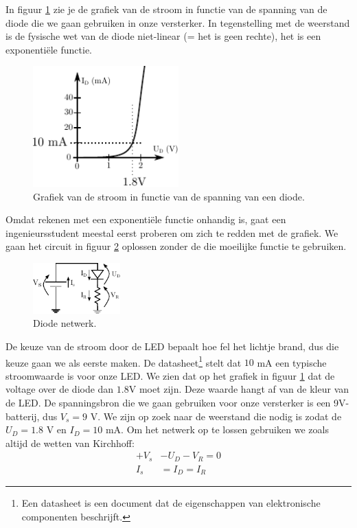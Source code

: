 \documentclass{article}
\begin{document}
			In figuur \ref{fig:diode_grafiek} zie je de grafiek van de stroom in functie van de spanning van de diode die we gaan gebruiken in onze versterker. In tegenstelling met de weerstand is de fysische wet van de diode niet-linear (= het is geen rechte), het is een exponenti\"ele functie. 
				\begin{figure}[htbp]
					\centering
					\includegraphics[width=0.5\textwidth]{diode_grafiek}
					\caption{Grafiek van de stroom in functie van de spanning van een diode.}
					\label{fig:diode_grafiek}
				\end{figure}
			Omdat rekenen met een exponenti\"ele functie onhandig is, gaat een ingenieursstudent meestal eerst proberen om zich te redden met de grafiek. We gaan het circuit in figuur \ref{fig:diode_netwerk} oplossen zonder de die moeilijke functie te gebruiken.

			\begin{figure}[htbp]
				\centering
				\includegraphics[width=0.3\textwidth]{diode_netwerk}
				\caption{Diode netwerk.}
				\label{fig:diode_netwerk}
			\end{figure}

			De keuze van de stroom door de LED bepaalt hoe fel het lichtje brand, dus die keuze gaan we als eerste maken. De datasheet\footnote{Een datasheet is een document dat de eigenschappen van elektronische componenten beschrijft.} stelt dat $10$ mA een typische stroomwaarde is voor onze LED. We zien dat op het grafiek in figuur \ref{fig:diode_grafiek} dat de voltage over de diode dan $1.8 $V moet zijn. Deze waarde hangt af van de kleur van de LED. De spanningsbron die we gaan gebruiken voor onze versterker is een 9V-batterij, dus $V_s = 9$ V. We zijn op zoek naar de weerstand die nodig is zodat de $U_D = 1.8$ V en $I_D =10$ mA. Om het netwerk op te lossen gebruiken we zoals altijd de wetten van Kirchhoff:
			\begin{align}
				+V_s &- U_D - V_R = 0  \\
				I_s &= I_D = I_R
			\end{align}
\end{document}
